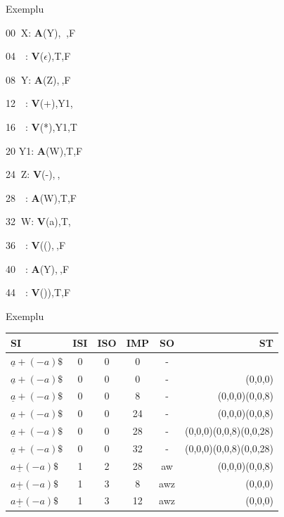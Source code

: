 \documentclass[pdf]{beamer}
\begin{document}
\begin{frame}{Exemplu}


00$\ $     X:  \textbf{A}(Y),  $\ $,F

04$\ \ \ $  :  \textbf{V}($\epsilon$),T,F

08$\ $     Y:  \textbf{A}(Z),$\ $,F

12$\ \ \ $  :  \textbf{V}(+),Y1,$\ $

16$\ \ \ $  :  \textbf{V}(*),Y1,T

20   Y1:  \textbf{A}(W),T,F 

24$\ $     Z:  \textbf{V}(-),$\ $,$\ $

28$\ \ \ $  :  \textbf{A}(W),T,F

32$\ $    W:  \textbf{V}(a),T,$\ $

36$\ \ \ $  :  \textbf{V}((),$\ $,F

40$\ \ \ $  :  \textbf{A}(Y),$\ $,F

44$\ \ \ $  :  \textbf{V}()),T,F

\end{frame}



\begin{frame}{Exemplu}
\begin{table}[H]
	\centering
	\begin{tabular}{|l c c c c r|}
		\hline
			\textbf{SI} & \textbf{ISI} & \textbf{ISO} & \textbf{IMP} & \textbf{SO} & \textbf{ST} \\
		\hline
			$\underline{a}+(-a)\$$ & 0 & 0 & 0 & - & \\
		\hline
			$\underline{a}+(-a)\$$ & 0 & 0 & 0 & - & (0,0,0) \\
		\hline
			$\underline{a}+(-a)\$$ & 0 & 0 & 8 & - & (0,0,0)(0,0,8) \\
		\hline
			$\underline{a}+(-a)\$$ & 0 & 0 & 24 & - & (0,0,0)(0,0,8) \\
		\hline
			$\underline{a}+(-a)\$$ & 0 & 0 & 28 & - & (0,0,0)(0,0,8)(0,0,28) \\
		\hline
			$\underline{a}+(-a)\$$ & 0 & 0 & 32 & - & (0,0,0)(0,0,8)(0,0,28) \\
		\hline
			$a\underline{+}(-a)\$$ & 1 & 2 & 28 & aw & (0,0,0)(0,0,8) \\
		\hline
			$a\underline{+}(-a)\$$ & 1 & 3 & 8 & awz & (0,0,0) \\
		\hline
			$a\underline{+}(-a)\$$ & 1 & 3 & 12 & awz & (0,0,0) \\
		\hline 
			
		\end{tabular}
	\end{table}
\end{frame}
\end{document}
